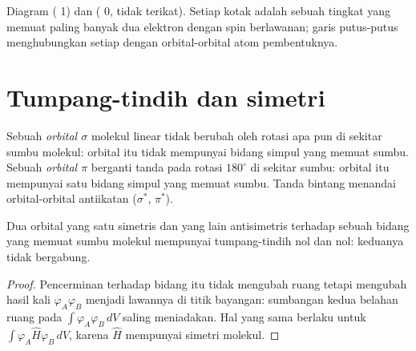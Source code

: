 \begin{omfigure}
\begin{MOdiagram}
\end{MOdiagram}
\hspace{1.5cm}
\begin{MOdiagram}
\end{MOdiagram}

{\small Diagram   ( 1) dan  ( 0, tidak terikat). Setiap kotak adalah sebuah tingkat yang memuat
paling banyak dua elektron dengan spin berlawanan; garis putus-putus
menghubungkan setiap  dengan orbital-orbital atom
pembentuknya.}
\end{omfigure}

\section{Tumpang-tindih dan simetri}

\begin{definition}\label{def:b2:diatomic-mos:sigma-pi}
Sebuah \emph{orbital $\sigma$} molekul
linear tidak berubah oleh rotasi apa pun di sekitar sumbu molekul: orbital
itu tidak mempunyai bidang simpul yang memuat sumbu. Sebuah
\emph{orbital $\pi$} berganti tanda pada
rotasi $180^\circ$ di sekitar sumbu: orbital itu mempunyai satu bidang simpul
yang memuat sumbu. Tanda bintang menandai orbital-orbital antiikatan
($\sigma^*$, $\pi^*$).
\end{definition}

\begin{proposition}\label{prop:b2:diatomic-mos:symmetry}
Dua orbital yang satu simetris dan yang lain antisimetris terhadap sebuah
bidang yang memuat sumbu molekul mempunyai tumpang-tindih nol dan  nol: keduanya tidak bergabung.
\end{proposition}

\begin{proof}
Pencerminan terhadap bidang itu tidak mengubah ruang tetapi mengubah hasil
kali $\varphi_A\varphi_B$ menjadi lawannya di titik bayangan: sumbangan kedua
belahan ruang pada $\int\varphi_A\varphi_B\,dV$ saling meniadakan. Hal yang sama
berlaku untuk $\int\varphi_A\hat H\varphi_B\,dV$, karena $\hat H$ mempunyai
simetri molekul.
\end{proof}

